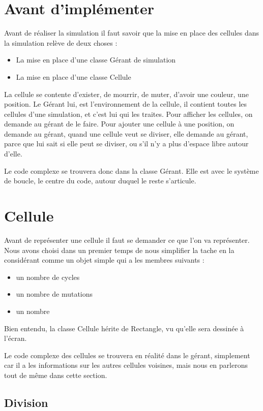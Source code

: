 \section{Avant d'implémenter}
Avant de réaliser la simulation il faut savoir que 
la mise en place des cellules dans la simulation relève de deux choses : 
\begin{itemize}
	\item La mise en place d'une classe Gérant de simulation
	\item La mise en place d'une classe Cellule
\end{itemize}

La cellule se contente d'exister, de mourrir, de muter, d'avoir une couleur, une position. Le Gérant lui, est l'environnement de la cellule, il contient toutes les cellules d'une simulation, et c'est lui qui les traites. Pour afficher les cellules, on demande au gérant de le faire. Pour ajouter une cellule à une position, on demande au gérant, quand une cellule veut se diviser, elle demande au gérant, parce que lui sait si elle peut se diviser, ou s'il n'y a plus d'espace libre autour d'elle.

Le code complexe se trouvera donc dans la classe Gérant. Elle est avec le système de boucle, le centre du code, autour duquel le reste s'articule.

\section{Cellule}

Avant de représenter une cellule il faut se demander ce que l'on va représenter. Nous avons choisi dans un premier temps de nous simplifier la tache en la considérant comme un objet simple qui a les membres suivants : 
\begin{itemize}
	\item un nombre de cycles
	\item un nombre de mutations
	\item un nombre 
\end{itemize}

Bien entendu, la classe Cellule hérite de Rectangle, vu qu'elle sera dessinée à l'écran.

Le code complexe des cellules se trouvera en réalité dans le gérant, simplement car il a les informations sur les autres cellules voisines, mais nous en parlerons tout de même dans cette section.

\subsection{Division}

